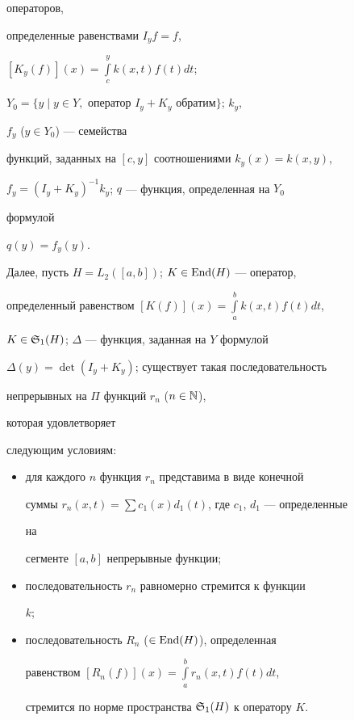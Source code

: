 операторов, 


определенные равенствами $I_y f=f$, 


$[K_y(f)](x)=\int\limits^y_c k(x,t)f(t)dt$; 


$Y_0=\{y\mid y\in Y,\text{ оператор }I_y+K_y\text{ обратим}\}$; $k_y$, 


$f_y$ ($y\in Y_0$) --- семейства 


функций, заданных на $[c,y]$ соотношениями $k_y(x)=k(x,y)$, 


$f_y=(I_y+K_y)^{-1}k_y$; $q$ --- функция, определенная на $Y_0$ 


формулой 


$q(y)=f_y(y)$. 


 


Далее, пусть $H=L_2([a,b])$; $K\in\operatorname{End}(H)$ --- оператор, 


определенный равенством $[K(f)](x)=\int\limits^b_a k(x,t)f(t)dt$,


$K\in\frak S_1(H)$; $\Delta$ --- функция, заданная на $Y$ формулой 


$\Delta(y)=\det(I_y+K_y)$; существует такая последовательность 


непрерывных на $\Pi$ функций $r_n$ ($n\in\Bbb N$), 


которая удовлетворяет 


следующим условиям: 


\begin{itemize} 


\item[1)] для каждого $n$ функция $r_n$ представима в виде конечной 


суммы $r_n(x,t)=\sum c_1(x)d_1(t)$, где $c_1$, $d_1$ --- определенные 


на 


сегменте $[a,b]$ непрерывные функции; 


\item[2)] последовательность $r_n$ равномерно стремится к функции 


$k$; 


\item[3)] последовательность $R_n$ ($\in\operatorname{End}(H)$), определенная 


равенством $[R_n(f)](x)=\int\limits^b_a r_n(x,t)f(t)dt$, 


стремится по норме пространства $\frak S_1(H)$ к оператору $K$. 


\end{itemize} 


